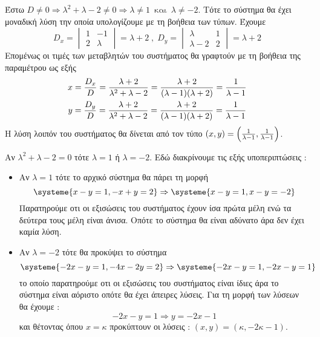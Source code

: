 \documentclass[twoside,nofonts,internet,methodoi]{thewria}
\DeclareRobustCommand{\frac}[3][0pt]{%
{\begingroup\hspace{#1}#2\hspace{#1}\endgroup\over\hspace{#1}#3\hspace{#1}}}
\begin{document}
\begin{rlist}
\item Έστω $ D\neq0\Rightarrow \lambda^2+\lambda-2\neq0\Rightarrow \lambda\neq1\,\textrm{ και }\,\lambda\neq-2 $. Τότε το σύστημα θα έχει μοναδική λύση την οποία υπολογίζουμε με τη βοήθεια των τύπων. Έχουμε
\[ D_x=\begin{vmatrix}
1 & -1\\2 & \lambda
\end{vmatrix}=\lambda+2\;,\;D_y=\begin{vmatrix}
\lambda & 1\\\lambda-2 & 2
\end{vmatrix}=\lambda+2 \]
Επομένως οι τιμές των μεταβλητών του συστήματος θα γραφτούν με τη βοήθεια της παραμέτρου ως εξής 
\begin{gather*} x=\frac{D_x}{D}=\frac{\lambda+2}{\lambda^2+\lambda-2}=\frac{\lambda+2}{(\lambda-1)(\lambda+2)}=\frac{1}{\lambda-1}\\
y=\frac{D_y}{D}=\frac{\lambda+2}{\lambda^2+\lambda-2}=\frac{\lambda+2}{(\lambda-1)(\lambda+2)}=\frac{1}{\lambda-1}
\end{gather*}
Η λύση λοιπόν του συστήματος θα δίνεται από τον τύπο $ (x,y)=\left(\frac{1}{\lambda-1},\frac{1}{\lambda-1} \right)  $.
\item Αν $ \lambda^2+\lambda-2=0 $ τότε $ \lambda=1 $ ή $ \lambda=-2 $. Εδώ διακρίνουμε τις εξής υποπεριπτώσεις :
\begin{itemize}
\item Αν $ \lambda=1 $ τότε το αρχικό σύστημα θα πάρει τη μορφή
\[ \systeme{x-y=1,-x+y=2}\Rightarrow\systeme{x-y=1,x-y=-2} \]
Παρατηρούμε οτι οι εξισώσεις του συστήματος έχουν ίσα πρώτα μέλη ενώ τα δεύτερα τους μέλη είναι άνισα. Οπότε το σύστημα θα είναι αδύνατο άρα δεν έχει καμία λύση.
\item Αν $ \lambda=-2 $ τότε θα προκύψει το σύστημα
\[ \systeme{-2x-y=1,-4x-2y=2}\Rightarrow\systeme{-2x-y=1,-2x-y=1} \]
το οποίο παρατηρούμε οτι οι εξισώσεις του συστήματος είναι ίδιες άρα το σύστημα είναι αόριστο οπότε θα έχει άπειρες λύσεις. Για τη μορφή των λύσεων θα έχουμε :
\[ -2x-y=1\Rightarrow y=-2x-1 \]
και θέτοντας όπου $ x=\kappa $ προκύπτουν οι λύσεις : $ (x,y)=(\kappa,-2\kappa-1) $.
\end{itemize}
\end{rlist}
\end{document}
